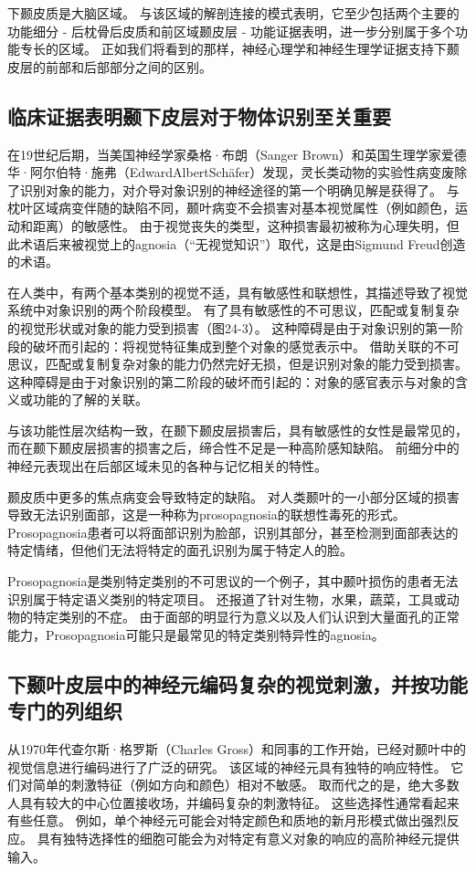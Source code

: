 下颞皮质是大脑区域。 
与该区域的解剖连接的模式表明，它至少包括两个主要的功能细分 - 后枕骨后皮质和前区域颞皮层 - 功能证据表明，进一步分别属于多个功能专长的区域。 
正如我们将看到的那样，神经心理学和神经生理学证据支持下颞皮层的前部和后部部分之间的区别。



\subsection{临床证据表明颞下皮层对于物体识别至关重要}

在19世纪后期，当美国神经学家桑格·布朗（Sanger Brown）和英国生理学家爱德华·阿尔伯特·施弗（EdwardAlbertSchäfer）发现，灵长类动物的实验性病变废除了识别对象的能力，对介导对象识别的神经途径的第一个明确见解是获得了。 
与枕叶区域病变伴随的缺陷不同，颞叶病变不会损害对基本视觉属性（例如颜色，运动和距离）的敏感性。 
由于视觉丧失的类型，这种损害最初被称为心理失明，但此术语后来被视觉上的agnosia（“无视觉知识”）取代，这是由Sigmund Freud创造的术语。


在人类中，有两个基本类别的视觉不适，具有敏感性和联想性，其描述导致了视觉系统中对象识别的两个阶段模型。
有了具有敏感性的不可思议，匹配或复制复杂的视觉形状或对象的能力受到损害（图24-3）。
这种障碍是由于对象识别的第一阶段的破坏而引起的：将视觉特征集成到整个对象的感觉表示中。 
借助关联的不可思议，匹配或复制复杂对象的能力仍然完好无损，但是识别对象的能力受到损害。
这种障碍是由于对象识别的第二阶段的破坏而引起的：对象的感官表示与对象的含义或功能的了解的关联。


与该功能性层次结构一致，在颞下颞皮层损害后，具有敏感性的女性是最常见的，而在颞下颞皮层损害的损害之后，缔合性不足是一种高阶感知缺陷。
前细分中的神经元表现出在后部区域未见的各种与记忆相关的特性。


颞皮质中更多的焦点病变会导致特定的缺陷。
对人类颞叶的一小部分区域的损害导致无法识别面部，这是一种称为prosopagnosia的联想性毒死的形式。 
Prosopagnosia患者可以将面部识别为脸部，识别其部分，甚至检测到面部表达的特定情绪，但他们无法将特定的面孔识别为属于特定人的脸。


Prosopagnosia是类别特定类别的不可思议的一个例子，其中颞叶损伤的患者无法识别属于特定语义类别的特定项目。
还报道了针对生物，水果，蔬菜，工具或动物的特定类别的不症。
由于面部的明显行为意义以及人们认识到大量面孔的正常能力，Prosopagnosia可能只是最常见的特定类别特异性的agnosia。



\subsection{下颞叶皮层中的神经元编码复杂的视觉刺激，并按功能专门的列组织}
从1970年代查尔斯·格罗斯（Charles Gross）和同事的工作开始，已经对颞叶中的视觉信息进行编码进行了广泛的研究。
该区域的神经元具有独特的响应特性。
它们对简单的刺激特征（例如方向和颜色）相对不敏感。 
取而代之的是，绝大多数人具有较大的中心位置接收场，并编码复杂的刺激特征。
这些选择性通常看起来有些任意。
例如，单个神经元可能会对特定颜色和质地的新月形模式做出强烈反应。
具有独特选择性的细胞可能会为对特定有意义对象的响应的高阶神经元提供输入。


